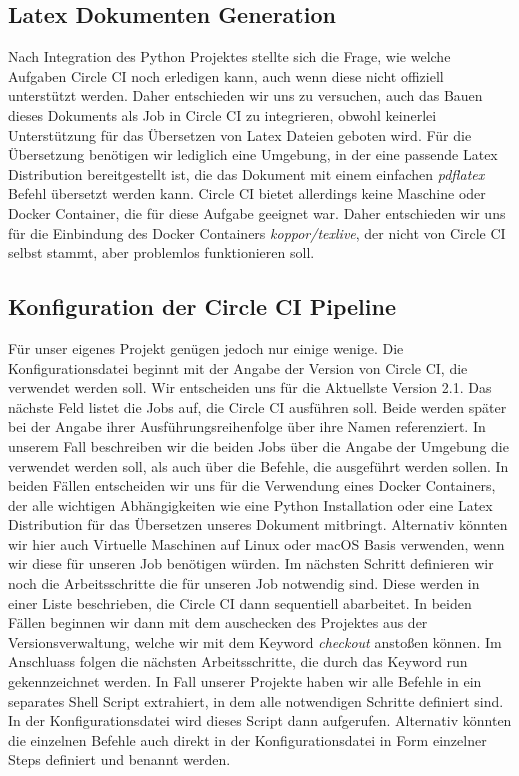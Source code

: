 \documentclass[11pt]{article}
\begin{document}
\subsection{Latex Dokumenten Generation}

Nach Integration des Python Projektes stellte sich die Frage, wie welche Aufgaben Circle CI noch erledigen kann, auch wenn diese nicht offiziell unterstützt werden. Daher entschieden wir uns zu versuchen, auch das Bauen dieses Dokuments als Job in Circle CI zu integrieren, obwohl keinerlei Unterstützung für das Übersetzen von Latex Dateien geboten wird. Für die Übersetzung benötigen wir lediglich eine Umgebung, in der eine passende Latex Distribution bereitgestellt ist, die das Dokument mit einem einfachen \textit{pdflatex} Befehl übersetzt werden kann. Circle CI bietet allerdings keine Maschine oder Docker Container, die für diese Aufgabe geeignet war. Daher entschieden wir uns für die Einbindung des Docker Containers \textit{koppor/texlive}, der nicht von Circle CI selbst stammt, aber problemlos funktionieren soll.

\subsection{Konfiguration der Circle CI Pipeline}
Für unser eigenes Projekt genügen jedoch nur einige wenige. Die Konfigurationsdatei beginnt mit der Angabe der Version von Circle CI, die verwendet werden soll. Wir entscheiden uns für die Aktuellste Version 2.1. Das nächste Feld listet die Jobs auf, die Circle CI ausführen soll. Beide werden später bei der Angabe ihrer Ausführungsreihenfolge über ihre Namen referenziert. In unserem Fall beschreiben wir die beiden Jobs über die Angabe der Umgebung die verwendet werden soll, als auch über die Befehle, die ausgeführt werden sollen. In beiden Fällen entscheiden wir uns für die Verwendung eines Docker Containers, der alle wichtigen Abhängigkeiten wie eine Python Installation oder eine Latex Distribution für das Übersetzen unseres Dokument mitbringt. Alternativ könnten wir hier auch Virtuelle Maschinen auf Linux oder macOS Basis verwenden, wenn wir diese für unseren Job benötigen würden.
Im nächsten Schritt definieren wir noch die Arbeitsschritte die für unseren Job notwendig sind. Diese werden in einer Liste beschrieben, die Circle CI dann sequentiell abarbeitet. In beiden Fällen beginnen wir dann mit dem auschecken des Projektes aus der Versionsverwaltung, welche wir mit dem Keyword \textit{checkout} anstoßen können. Im Anschluass folgen die nächsten Arbeitsschritte, die durch das Keyword run gekennzeichnet werden. In Fall unserer Projekte haben wir alle Befehle in ein separates Shell Script extrahiert, in dem alle notwendigen Schritte definiert sind. In der Konfigurationsdatei wird dieses Script dann aufgerufen. Alternativ könnten die einzelnen Befehle auch direkt in der Konfigurationsdatei in Form einzelner Steps definiert und benannt werden.
\end{document}
